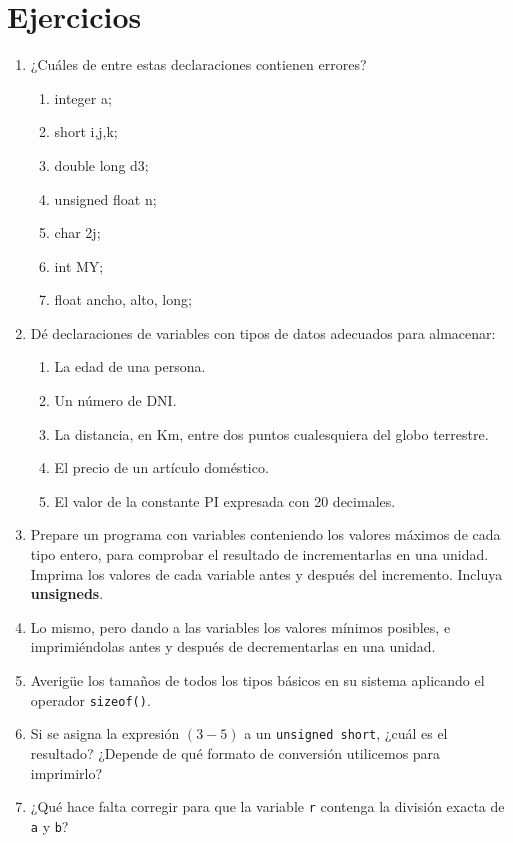 
\section{Ejercicios}
\label{sec:tc-tipos-ej}
\begin{enumerate}
	\item ¿Cuáles de entre estas declaraciones contienen errores?
		\begin{multicols}{2}
		\begin{enumerate}[label=\alph*.]
			\item integer a;
			\item short i,j,k;
			\item double long d3;
			\item unsigned float n;
			\item char 2j;
			\item int MY;
			\item float ancho, alto, long;
		\end{enumerate}
		\end{multicols}
	\item Dé declaraciones de variables con tipos de datos adecuados para almacenar:
	\begin{enumerate}[label=\alph*.]
		\item La edad de una persona.
		\item Un número de DNI.
		\item La distancia, en Km, entre dos puntos cualesquiera del globo terrestre.
		\item El precio de un artículo doméstico.
		\item El valor de la constante PI expresada con 20 decimales.
	\end{enumerate}
	\item Prepare un programa con variables conteniendo los valores máximos de cada tipo entero, para
comprobar el resultado de incrementarlas en una unidad. Imprima los valores de cada variable antes y
después del incremento. Incluya \textbf{unsigneds}.
	\item Lo mismo, pero dando a las variables los valores mínimos posibles, e imprimiéndolas antes y
después de decrementarlas en una unidad.
	\item Averigüe los tamaños de todos los tipos básicos en su sistema aplicando el operador \lstinline{sizeof()}.
	\item Si se asigna la expresión $(3-5)$ a un \lstinline{unsigned short}, ¿cuál es el resultado? ¿Depende de qué formato de conversión utilicemos para imprimirlo?
	\item ¿Qué hace falta corregir para que la variable \lstinline{r} contenga la división exacta de \lstinline{a} y \lstinline{b}?

\end{enumerate}
